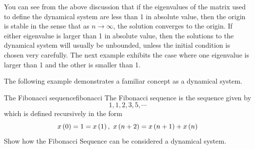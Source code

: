 You can see from the above discussion that if the eigenvalues of the matrix
used to define the dynamical system are less than 1 in absolute value, then
the origin is stable in the sense that as $n\rightarrow \infty$, the
solution converges to the origin. If either eigenvalue is larger than 1 in
absolute value, then the solutions to the dynamical system will usually be
unbounded, unless the initial condition is chosen very carefully. The next
example exhibits the case where one eigenvalue is larger than 1 and the
other is smaller than 1.

The following example demonstrates a familiar concept as a dynamical system.

\begin{example}{The Fibonacci sequence}{fibonacci}
The Fibonacci sequence is the sequence given by 
\begin{equation*}
1, 1, 2, 3, 5, \cdots
\end{equation*}
which is defined recursively in the
form
\begin{equation*}
x\left(0\right) =1=x\left(1\right) ,\ x\left(n+2\right) =x\left(
n+1\right) +x\left(n\right)
\end{equation*}
Show how the Fibonacci Sequence can be considered a dynamical system.
\end{example}

